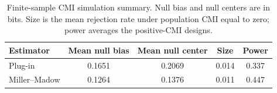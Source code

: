 \begin{table}[!htbp]
\caption{Finite-sample CMI simulation summary. Null bias and null centers are in bits. Size is the mean rejection rate under population CMI equal to zero; power averages the positive-CMI designs.}
\label{tab:e12_simulation_summary}
\centering
\begin{tabular*}{\textwidth}{@{\extracolsep{\fill}}lcccc@{}}
\toprule
\textbf{Estimator} & \textbf{Mean null bias} & \textbf{Mean null center} & \textbf{Size} & \textbf{Power}\\
\midrule
Plug-in & 0.1651 & 0.2069 & 0.014 & 0.337\\
Miller--Madow & 0.1264 & 0.1376 & 0.011 & 0.447\\
\bottomrule
\end{tabular*}
\end{table}
